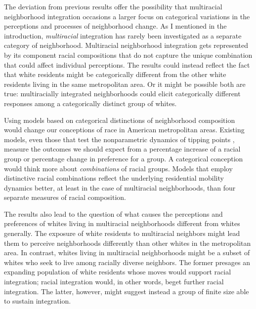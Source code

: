 \documentclass{baderart}
\begin{document}
The deviation from previous results offer the possibility that multiracial neighborhood integration occasions a larger focus on categorical variations in the perceptions and processes of neighborhood change. As I mentioned in the introduction, \emph{multiracial} integration has rarely been investigated as a separate category of neighborhood. Multiracial neighborhood integration gets represented by its component racial compositions that do not capture the unique combination that could affect individual perceptions. The results could instead reflect the fact that white residents might be categorically different from the other white residents living in the same metropolitan area. Or it might be possible both are true: multiracially integrated neighborhoods could elicit categorically different responses among a categorically distinct group of whites. 

Using models based on categorical distinctions of neighborhood composition would change our conceptions of race in American metropolitan areas. Existing models, even those that test the nonparametric dynamics of tipping points \citep[e.g.,][]{schelling_dynamic_1971, bruch_neighborhood_2006, xie_modeling_2012}, measure the outcomes we should expect from a percentage increase of a racial group or percentage change in preference for a group. A categorical conception would think more about \emph{combinations} of racial groups. Models that employ distinctive racial combinations reflect the underlying residential mobility dynamics better, at least in the case of multiracial neighborhoods, than four separate measures of racial composition. 

The results also lead to the question of what causes the perceptions and preferences of whites living in multiracial neighborhoods different from whites generally. The exposure of white residents to multiracial neighbors might lead them to perceive neighborhoods differently than other whites in the metropolitan area. In contrast, whites living in multiracial neighborhoods might be a subset of whites who seek to live among racially diverse neighbors. The former presages an expanding population of white residents whose moves would support racial integration; racial integration would, in other words, beget further racial integration. The latter, however, might suggest instead a group of finite size able to sustain integration. 
\end{document}
